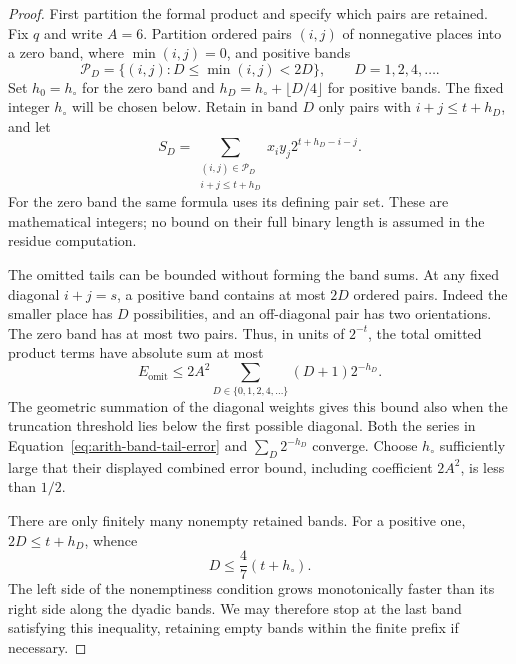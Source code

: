 \begin{proof}
First partition the formal product and specify which pairs are retained. Fix $q$ and write $A=6$.  Partition ordered pairs $(i,j)$ of
nonnegative places into a zero band, where $\min(i,j)=0$, and
positive bands
\[
 \mathcal P_D=\{(i,j):D\leq\min(i,j)<2D\},
 \qquad D=1,2,4,\ldots.
\]
Set $h_0=h_\circ$ for the zero band and
$h_D=h_\circ+\lfloor D/4\rfloor$ for positive bands.  The fixed
integer $h_\circ$ will be chosen below.  Retain in band $D$ only
pairs with $i+j\leq t+h_D$, and let
\begin{equation}
 S_D=\sum_{\substack{(i,j)\in\mathcal P_D\\i+j\leq t+h_D}}
           x_i y_j2^{t+h_D-i-j}.
 \label{eq:arith-band-integer}
\end{equation}
For the zero band the same formula uses its defining pair set.
These are mathematical integers; no bound on their full binary
length is assumed in the residue computation.

The omitted tails can be bounded without forming the band sums. At any fixed diagonal $i+j=s$, a positive band contains at most
$2D$ ordered pairs.  Indeed the smaller place has $D$ possibilities,
and an off-diagonal pair has two orientations.  The zero band has
at most two pairs.  Thus, in units of $2^{-t}$, the total omitted
product terms have absolute sum at most
\begin{equation}
 E_{\mathrm{omit}}
 \leq 2A^2\sum_{D\in\{0,1,2,4,\ldots\}}(D+1)2^{-h_D}.
 \label{eq:arith-band-tail-error}
\end{equation}
The geometric summation of the diagonal weights gives this bound
also when the truncation threshold lies below the first possible
diagonal.  Both the series in Equation~\eqref{eq:arith-band-tail-error}
and $\sum_D2^{-h_D}$ converge.  Choose $h_\circ$ sufficiently large
that their displayed combined error bound, including coefficient
$2A^2$, is less than $1/2$.

There are only finitely many nonempty retained bands.  For a
positive one, $2D\leq t+h_D$, whence
\begin{equation}
 D\leq\frac47(t+h_\circ).
 \label{eq:arith-last-band}
\end{equation}
The left side of the nonemptiness condition grows monotonically
faster than its right side along the dyadic bands.  We may therefore
stop at the last band satisfying this inequality, retaining empty
bands within the finite prefix if necessary.


\end{proof}
